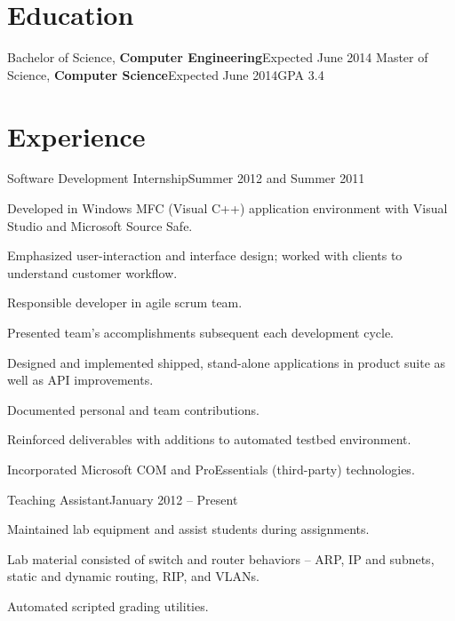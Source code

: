 \documentclass[margin,line,oneside,a4paper]{resume}
\begin{document}
\begin{resume}


   \createContactInformation


   \section{\mysidestyle Education}

   {Bachelor of Science, \textbf{Computer Engineering}}{Expected June 2014}%
   {Master of Science, \textbf{Computer Science}}{Expected June 2014}{GPA 3.4}

   \section{\mysidestyle Experience}

   {Software Development Internship}{Summer 2012 and Summer 2011}
   \begin{list2}
   \item Developed in Windows MFC (Visual C++) application environment with Visual Studio and Microsoft Source Safe.
   \item Emphasized user-interaction and interface design; worked with clients to understand customer workflow.
   \item Responsible developer in agile scrum team. 
   \item Presented team's accomplishments subsequent each development cycle.
   \item Designed and implemented shipped, stand-alone applications in product suite as well as API improvements.
   \item Documented personal and team contributions.
   \item Reinforced deliverables with additions to automated testbed environment.
   \item Incorporated Microsoft COM and ProEssentials (third-party) technologies.
   \end{list2}

   {Teaching Assistant}{January 2012 -- Present}
   \begin{list2}
   \item Maintained lab equipment and assist students during assignments.
   \item Lab material consisted of switch and router behaviors -- ARP, IP and subnets, static and dynamic routing, RIP, and VLANs.
   \item Automated scripted grading utilities.
   \end{list2}



\end{resume}
\end{document}
